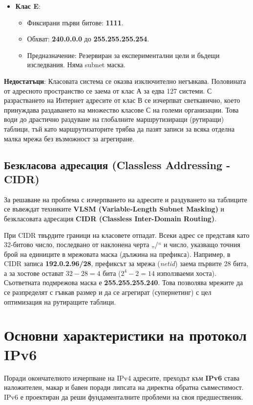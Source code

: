 \documentclass{scrartcl}
\begin{document}
\begin{FlushLeft}
\begin{itemize}
    \item \textbf{Клас E}:
    \begin{itemize}
        \item Фиксирани първи битове: \textbf{1111}.
        \item Обхват: \textbf{240.0.0.0} до \textbf{255.255.255.254}.
        \item Предназначение: Резервиран за експериментални цели и бъдещи изследвания. Няма subnet маска.
    \end{itemize}
\end{itemize}

\textbf{Недостатъци}: Класовата система се оказва изключително негъвкава. Половината от адресното пространство се заема от клас А за едва 127 системи. С разрастването на Интернет адресите от клас В се изчерпват светкавично, което принуждава раздаването на множество класове С на големи организации. Това води до драстично раздуване на глобалните маршрутизиращи (рутиращи) таблици, тъй като маршрутизаторите трябва да пазят записи за всяка отделна малка мрежа без възможност за агрегиране.

\subsection{Безкласова адресация (Classless Addressing - CIDR)}
За решаване на проблема с изчерпването на адресите и раздуването на таблиците се въвеждат техниките \textbf{VLSM (Variable-Length Subnet Masking)} и безкласовата адресация \textbf{CIDR (Classless Inter-Domain Routing)}.

При CIDR твърдите граници на класовете отпадат. Всеки адрес се представя като 32-битово число, последвано от наклонена черта „/“ и число, указващо точния брой на единиците в мрежовата маска (дължина на префикса). 
Например, в CIDR записа \textbf{192.0.2.96/28}, префиксът за мрежа (\textit{netid}) заема първите 28 бита, а за хостове остават $32 - 28 = 4$ бита ($2^4-2 = 14$ използваеми хоста). Съответната подмрежова маска е \textbf{255.255.255.240}. Това позволява мрежите да се разпределят с гъвкав размер и да се агрегират (супернетинг) с цел оптимизация на рутиращите таблици.


\section{Основни характеристики на протокол IPv6}

Поради окончателното изчерпване на IPv4 адресите, преходът към \textbf{IPv6} става наложителен, макар и бавен поради липсата на директна обратна съвместимост. IPv6 е проектиран да реши фундаменталните проблеми на своя предшественик.


\end{FlushLeft}
\end{document}
